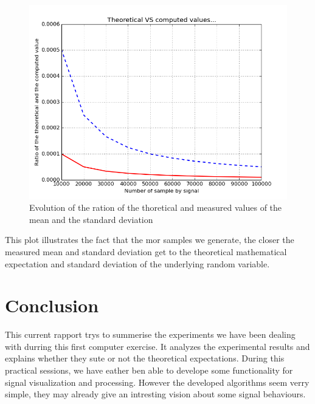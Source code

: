 \documentclass[a4paper,10pt]{article}
\begin{document}
	\begin{figure}[ht!]
	  \center
	  \includegraphics[width=0.8\linewidth]{theoreticalVScomputed.png}
	  \caption{Evolution of the ration of the thoretical and measured values of the mean and the standard deviation}
	  \label{theoreticalVScomputed}
	\end{figure}
	This plot illustrates the fact that the mor samples we generate, the closer the measured mean and standard deviation get to the theoretical mathematical expectation and standard deviation of the underlying random variable.
	
	


\section{Conclusion}
This current rapport trys to summerise the experiments we have been dealing with durring this first computer exercise.  It analyzes the experimental results and explains whether they sute or not the theoretical expectations.\newline
During this practical sessions, we have eather ben able to develope some functionality for signal visualization and processing. However the developed algorithms seem verry simple, they may already give an intresting vision about some signal behaviours.
\end{document}
